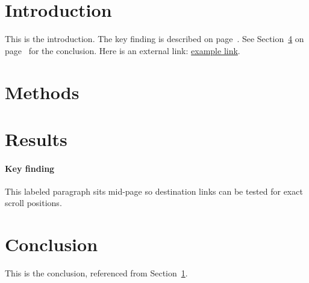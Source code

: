 \documentclass{article}
\begin{document}
\tableofcontents
\newpage

\section{Introduction}
\label{sec:intro}
This is the introduction. The key finding is described on
page~\pageref{par:key}. See Section~\ref{sec:conclusion} on
page~\pageref{sec:conclusion} for the conclusion.
Here is an external link: \href{https://example.com/}{example link}.

\lipsum[1-4]
\newpage

\section{Methods}
\label{sec:methods}
\lipsum[5-8]
\newpage

\section{Results}
\label{sec:results}
\lipsum[9-10]

\paragraph{Key finding}
\label{par:key}
This labeled paragraph sits mid-page so destination links can be tested
for exact scroll positions.

\lipsum[11-12]
\newpage

\section{Conclusion}
\label{sec:conclusion}
This is the conclusion, referenced from Section~\ref{sec:intro}.
\lipsum[13-15]
\end{document}
